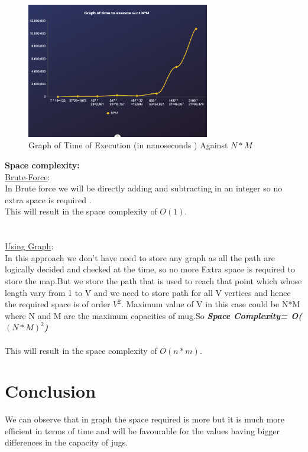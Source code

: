 \documentclass[conference]{IEEEtran}
\begin{document}
\begin{figure}[h]
\caption{Graph of Time of Execution (in nanoseconds ) Against $N*M$}
\centering
\includegraphics[width=8cm]{images/graphs.jpg}
\end{figure}


\textbf{Space complexity:}\\
\underline{Brute-Force}:\\
In Brute force we will be directly adding and subtracting in an integer so no extra space is required .\\
This will result in the space complexity of $O(1)$. 
\\\\\\
\underline{Using  Graph}:\\
In this  approach we don't have need to store any graph as all the path are logically decided and checked at the time, so no more Extra space is required to store the map.But we store the path that is used to reach that point which whose length vary from 1 to V and we need to store path for all V vertices and hence the required space is of order $V^{2}$.  Maximum value of V in this case could be N*M where N and M are the maximum capacities of mug.So \textit{\textbf{Space Complexity= O($(N*M)^{2}$)}}\\\\

This will result in the space complexity of $O(n*m)$. 

\section{Conclusion}
We can observe that in graph the space required is more but it is much more efficient in terms of time and will be favourable for the values having bigger differences in the capacity of jugs.
\end{document}
